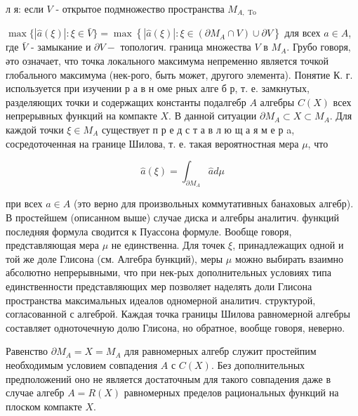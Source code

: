 \documentclass[10pt]{article}
\begin{document}
л я: если $V$ - открытое подмножество пространства $M_{A, \text { To }}$



$\max \{|\hat{a}(\xi)|: \xi \in \bar{V}\}=\max \left\{|\hat{a}(\xi)|: \xi \in\left(\partial M_{A} \cap V\right) \cup \partial V\right\}$ для всех $a \in A$, где $\bar{V}$ - замыкание и $\partial V-$ топологич. граница множества $V$ в $M_{A}$. Грубо говоря, әто означает, что точка локального максимума непременно является точкой глобального максимума (нек-рого, быть может, другого элемента). Понятие К. г. используется при изучении р а в н оме рных алге б р, т. е. замкнутых, разделяющих точки и содержащих константы подалгебр $A$ алгебры $C(X)$ всех непрерывных функций на компакте $X$. В данной ситуации $\partial M_{A} \subset X \subset M_{A}$. Для каждой точки $\xi \in M_{A}$ существует п р е д с т а в л ю щ а я м е р a, сосредоточенная на границе Шилова, т. е. такая вероятностная мера $\mu$, что



\[

\hat{a}(\xi)=\int_{\partial M_{A}} \hat{a} d \mu

\]



при всех $a \in A$ (это верно для произвольных коммутативных банаховых алгебр). В простейшем (описанном выше) случае диска и алгебры аналитич. функций последняя формула сводится к Пуассона формуле. Вообще говоря, представляющая мера $\mu$ не единственна. Для точек $\xi$, принадлежащих одной и той же доле Глисона (см. Алгебра бункций), меры $\mu$ можно выбирать взаимно абсолютно непрерывными, что при нек-рых дополнительных условиях типа единственности представляющих мер позволяет наделять доли Глисона пространства максимальных идеалов одномерной аналитич. структурой, согласованной с алгеброй. Каждая точка границы Шилова равномерной алгебры составляет одноточечную долю Глисона, но обратное, вообще говоря, неверно.



Равенство $\partial M_{A}=X=M_{A}$ для равномерных алгебр служит простейпим необходимым условием совпадения $A$ с $C(X)$. Без дополнительных предположений оно не является достаточным для такого совпадения даже в случае алгебр $A=R(X)$ равномерных пределов рациональных функций на плоском компакте $X$.
\end{document}
